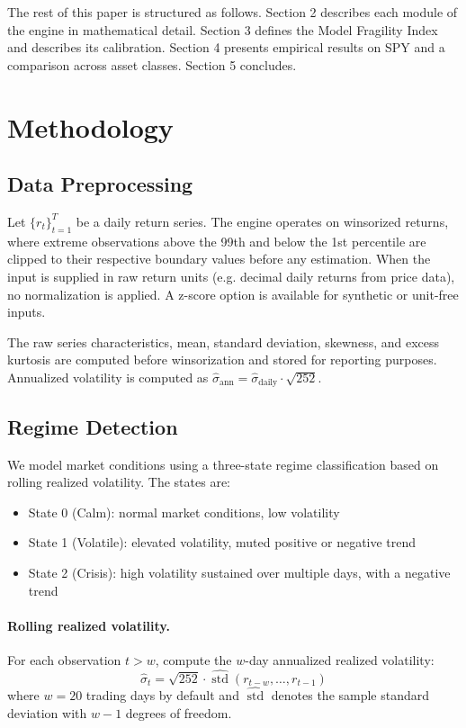 \documentclass[12pt]{article}
\begin{document}
The rest of this paper is structured as follows. Section 2 describes each module of
the engine in mathematical detail. Section 3 defines the Model Fragility Index and
describes its calibration. Section 4 presents empirical results on SPY and a comparison
across asset classes. Section 5 concludes.


\section{Methodology}

\subsection{Data Preprocessing}

Let $\{r_t\}_{t=1}^{T}$ be a daily return series. The engine operates on winsorized
returns, where extreme observations above the 99th and below the 1st percentile are
clipped to their respective boundary values before any estimation. When the input is
supplied in raw return units (e.g. decimal daily returns from price data), no
normalization is applied. A z-score option is available for synthetic or unit-free inputs.

The raw series characteristics, mean, standard deviation, skewness, and excess kurtosis
are computed before winsorization and stored for reporting purposes. Annualized volatility
is computed as $\hat{\sigma}_{\text{ann}} = \hat{\sigma}_{\text{daily}} \cdot \sqrt{252}$.

\subsection{Regime Detection}

We model market conditions using a three-state regime classification based on rolling
realized volatility. The states are:
\begin{itemize}[noitemsep]
  \item State 0 (Calm): normal market conditions, low volatility
  \item State 1 (Volatile): elevated volatility, muted positive or negative trend
  \item State 2 (Crisis): high volatility sustained over multiple days, with a negative trend
\end{itemize}

\paragraph{Rolling realized volatility.}
For each observation $t > w$, compute the $w$-day annualized realized volatility:
\begin{equation}
  \hat{\sigma}_t = \sqrt{252} \cdot \widehat{\operatorname{std}}(r_{t-w}, \ldots, r_{t-1})
  \label{eq:rv}
\end{equation}
where $w = 20$ trading days by default and $\widehat{\operatorname{std}}$ denotes the
sample standard deviation with $w - 1$ degrees of freedom.
\end{document}

